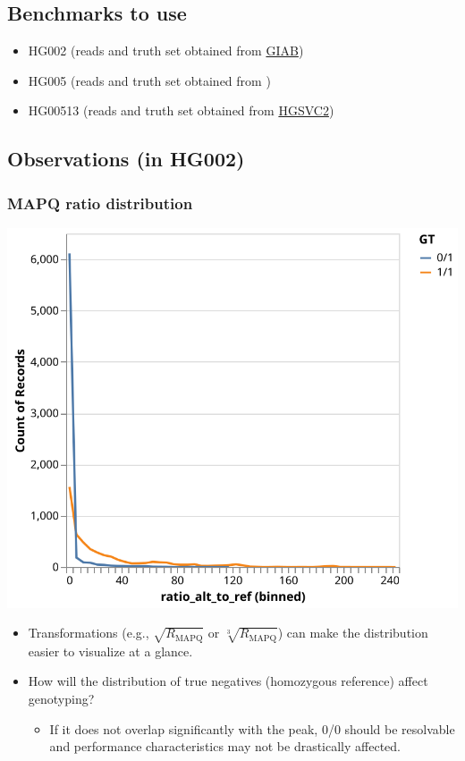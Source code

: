 \documentclass{article}
\begin{document}
\subsection{Benchmarks to use}

\begin{itemize}
\item HG002 (reads and truth set obtained from \href{https://github.com/human-pangenomics/HG002\_Data\_Freeze\_v1.0}{GIAB})
\item HG005 (reads and truth set obtained from \cite{Duan_2022})
\item HG00513 (reads and truth set obtained from \href{https://www.internationalgenome.org/data-portal/data-collection/hgsvc2}{HGSVC2})
\end{itemize}

\subsection{Observations (in HG002)}

\subsubsection{MAPQ ratio distribution}

\includegraphics[width=0.7\linewidth]{files/mapq_chart-9fd31293e90b26bea2acdc0f0d71e94c.svg}

\begin{itemize}
\item Transformations (e.g., $\sqrt{R_{\text{MAPQ}}}$ or $\sqrt[3]{R_{\text{MAPQ}}}$) can make the distribution easier to visualize at a glance.
\item How will the distribution of true negatives (homozygous reference) affect genotyping?\begin{itemize}
\item If it does not overlap significantly with the peak, 0/0 should be resolvable and performance characteristics may not be drastically affected.
\end{itemize}
\end{itemize}
\end{document}
